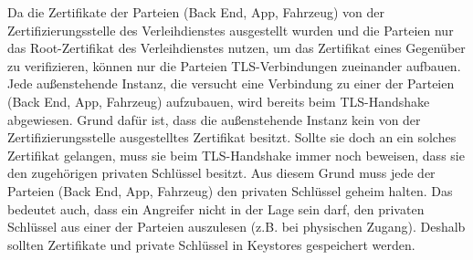 Da die Zertifikate der Parteien (Back End, App, Fahrzeug) von der Zertifizierungsstelle des Verleihdienstes ausgestellt wurden und die Parteien nur das Root-Zertifikat des Verleihdienstes nutzen, um das Zertifikat eines Gegenüber zu verifizieren, können nur die Parteien TLS-Verbindungen zueinander aufbauen. Jede außenstehende Instanz, die versucht eine Verbindung zu einer der Parteien (Back End, App, Fahrzeug) aufzubauen, wird bereits beim TLS-Handshake abgewiesen. Grund dafür ist, dass die außenstehende Instanz kein von der Zertifizierungsstelle ausgestelltes Zertifikat besitzt. Sollte sie doch an ein solches Zertifikat gelangen, muss sie beim TLS-Handshake immer noch beweisen, dass sie den zugehörigen privaten Schlüssel besitzt. Aus diesem Grund muss jede der Parteien (Back End, App, Fahrzeug) den privaten Schlüssel geheim halten. Das bedeutet auch, dass ein Angreifer nicht in der Lage sein darf, den privaten Schlüssel aus einer der Parteien auszulesen (z.B. bei physischen Zugang). Deshalb sollten Zertifikate und private Schlüssel in Keystores gespeichert werden.